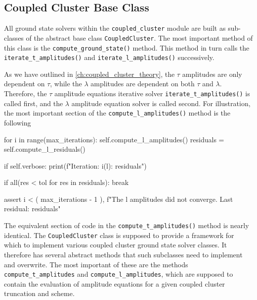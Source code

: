     \subsection{Coupled Cluster Base Class}

    \begin{figure}
    
    \end{figure}

    All ground state solvers within the \lstinline{coupled_cluster} module are built 
    as sub-classes of the abstract base class \lstinline{CoupledCluster}. The most
    important method of this class is the \lstinline{compute_ground_state()} method.
    This method in turn calls the \lstinline{iterate_t_amplitudes()} and 
    \lstinline{iterate_l_amplitudes()} successively. 

    As we have outlined in 
    \autoref{ch:coupled_cluster_theory}, the $\tau$ amplitudes are only dependent on 
    $\tau$, while the $\lambda$ amplitudes are dependent on both $\tau$ and $\lambda$.
    Therefore, the $\tau$ amplitude equations iterative solver
    \lstinline{iterate_t_amplitudes()} is called first, and the $\lambda$ amplitude
    equation solver is called second.
    For illustration, the most important section of the \lstinline{compute_l_amplitudes()} method 
    is the following
    \begin{python}
    for i in range(max_iterations):
    self.compute_l_amplitudes()
    residuals = self.compute_l_residuals()

    if self.verbose:
        print(f"Iteration: {i}\tResiduals (l): {residuals}")

    if all(res < tol for res in residuals):
        break

    assert i < (
        max_iterations - 1
    ), f"The l amplitudes did not converge. Last residual: {residuals}" 
    \end{python}
    The equivalent section of code in the \lstinline{compute_t_amplitudes()} method is 
    nearly identical.
    The \lstinline{CoupledCluster} class is supposed to provide a framework for which 
    to implement various coupled cluster ground state solver classes. It therefore
    has several abstract methods that such subclasses need to implement and overwrite.
    The most important of these are the methods \lstinline{compute_t_amplitudes} 
    and \lstinline{compute_l_amplitudes}, which are supposed to contain the evaluation 
    of amplitude equations for a given coupled cluster truncation and scheme. 

